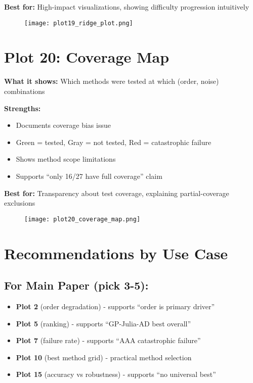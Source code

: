 \documentclass[11pt]{article}
\begin{document}
\textbf{Best for:} High-impact visualizations, showing difficulty progression intuitively

\begin{figure}[h]
\centering
\texttt{[image: plot19\_ridge\_plot.png]}
\end{figure}

\clearpage


\section*{Plot 20: Coverage Map}

\textbf{What it shows:} Which methods were tested at which (order, noise) combinations

\textbf{Strengths:}
\begin{itemize}
    \item Documents coverage bias issue
    \item Green = tested, Gray = not tested, Red = catastrophic failure
    \item Shows method scope limitations
    \item Supports ``only 16/27 have full coverage'' claim
\end{itemize}

\textbf{Best for:} Transparency about test coverage, explaining partial-coverage exclusions

\begin{figure}[h]
\centering
\texttt{[image: plot20\_coverage\_map.png]}
\end{figure}

\clearpage


\section*{Recommendations by Use Case}

\subsection*{For Main Paper (pick 3-5):}
\begin{itemize}
    \item \textbf{Plot 2} (order degradation) - supports ``order is primary driver''
    \item \textbf{Plot 5} (ranking) - supports ``GP-Julia-AD best overall''
    \item \textbf{Plot 7} (failure rate) - supports ``AAA catastrophic failure''
    \item \textbf{Plot 10} (best method grid) - practical method selection
    \item \textbf{Plot 15} (accuracy vs robustness) - supports ``no universal best''
\end{itemize}
\end{document}
